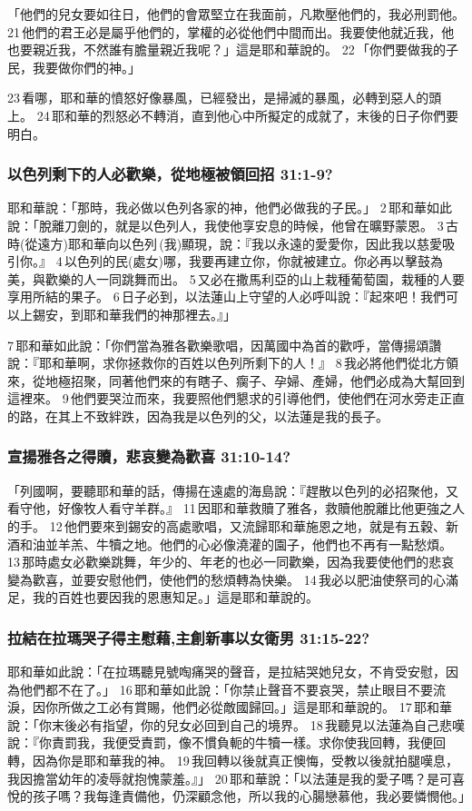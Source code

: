「他們的兒女要如往日，他們的會眾堅立在我面前，凡欺壓他們的，我必刑罰他。 21 他們的君王必是屬乎他們的，掌權的必從他們中間而出。我要使他就近我，他也要親近我，不然誰有膽量親近我呢？」這是耶和華說的。 22 「你們要做我的子民，我要做你們的神。」

23 看哪，耶和華的憤怒好像暴風，已經發出，是掃滅的暴風，必轉到惡人的頭上。 24 耶和華的烈怒必不轉消，直到他心中所擬定的成就了，末後的日子你們要明白。

\subsubsection{以色列剩下的人必歡樂，從地極被領回招 31:1-9?}
耶和華說：「那時，我必做以色列各家的神，他們必做我的子民。」 2 耶和華如此說：「脫離刀劍的，就是以色列人，我使他享安息的時候，他曾在曠野蒙恩。 3 古時(從遠方)耶和華向以色列 (我)顯現，說：『我以永遠的愛愛你，因此我以慈愛吸引你。』 4 以色列的民(處女)哪，我要再建立你，你就被建立。你必再以擊鼓為美，與歡樂的人一同跳舞而出。 5 又必在撒馬利亞的山上栽種葡萄園，栽種的人要享用所結的果子。 6 日子必到，以法蓮山上守望的人必呼叫說：『起來吧！我們可以上錫安，到耶和華我們的神那裡去。』」

7 耶和華如此說：「你們當為雅各歡樂歌唱，因萬國中為首的歡呼，當傳揚頌讚說：『耶和華啊，求你拯救你的百姓以色列所剩下的人！』 8 我必將他們從北方領來，從地極招聚，同著他們來的有瞎子、瘸子、孕婦、產婦，他們必成為大幫回到這裡來。 9 他們要哭泣而來，我要照他們懇求的引導他們，使他們在河水旁走正直的路，在其上不致絆跌，因為我是以色列的父，以法蓮是我的長子。

\subsubsection{宣揚雅各之得贖，悲哀變為歡喜 31:10-14?}
「列國啊，要聽耶和華的話，傳揚在遠處的海島說：『趕散以色列的必招聚他，又看守他，好像牧人看守羊群。』 11 因耶和華救贖了雅各，救贖他脫離比他更強之人的手。 12 他們要來到錫安的高處歌唱，又流歸耶和華施恩之地，就是有五穀、新酒和油並羊羔、牛犢之地。他們的心必像澆灌的園子，他們也不再有一點愁煩。 13 那時處女必歡樂跳舞，年少的、年老的也必一同歡樂，因為我要使他們的悲哀變為歡喜，並要安慰他們，使他們的愁煩轉為快樂。 14 我必以肥油使祭司的心滿足，我的百姓也要因我的恩惠知足。」這是耶和華說的。

\subsubsection{拉結在拉瑪哭子得主慰藉,主創新事以女衛男 31:15-22?}
耶和華如此說：「在拉瑪聽見號啕痛哭的聲音，是拉結哭她兒女，不肯受安慰，因為他們都不在了。」 16 耶和華如此說：「你禁止聲音不要哀哭，禁止眼目不要流淚，因你所做之工必有賞賜，他們必從敵國歸回。」這是耶和華說的。 17 耶和華說：「你末後必有指望，你的兒女必回到自己的境界。 18 我聽見以法蓮為自己悲嘆說：『你責罰我，我便受責罰，像不慣負軛的牛犢一樣。求你使我回轉，我便回轉，因為你是耶和華我的神。 19 我回轉以後就真正懊悔，受教以後就拍腿嘆息，我因擔當幼年的凌辱就抱愧蒙羞。』」 20 耶和華說：「以法蓮是我的愛子嗎？是可喜悅的孩子嗎？我每逢責備他，仍深顧念他，所以我的心腸戀慕他，我必要憐憫他。」

